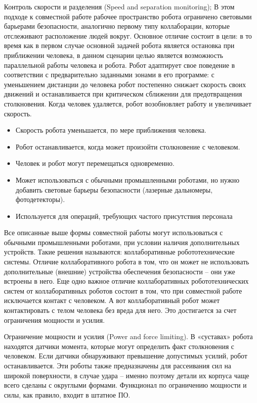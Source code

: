 Контроль скорости и разделения (Speed and separation monitoring);
В этом подходе к совместной работе рабочее пространство робота ограничено световыми барьерами безопасности, аналогично первому типу коллаборации, которые отслеживают расположение людей вокруг. Основное отличие состоит в цели: в то время как в первом случае основной задачей робота является остановка при приближении человека, в данном сценарии целью является возможность параллельной работы человека и робота. Робот адаптирует свое поведение в соответствии с предварительно заданными зонами в его программе: с уменьшением дистанции до человека робот постепенно снижает скорость своих движений и останавливается при критическом сближении для предотвращения столкновения. Когда человек удаляется, робот возобновляет работу и увеличивает скорость.
\begin{itemize}
	\item Скорость робота уменьшается, по мере приближения человека.
	\item Робот останавливается, когда может произойти столкновение с человеком.
	\item Человек и робот могут перемещаться одновременно.
	\item Может использоваться с обычными промышленными роботами, но нужно добавить световые барьеры безопасности (лазерные дальномеры, фотодетекторы).
	\item Используется для операций, требующих частого присутствия персонала
\end{itemize}

Все описанные выше формы совместной работы могут использоваться с обычными промышленными роботами, при условии наличия дополнительных устройств. Такие решения называются: коллаборативные робототехнические системы. Отличие коллаборативного робота в том, что он может не использовать дополнительные (внешние) устройства обеспечения безопасности – они уже встроены в него. Еще одно важное отличие коллаборативных робототехнических систем от коллаборативных роботов состоит в том, что при совместной работе исключается контакт с человеком. А вот коллаборативный робот может контактировать с телом человека без вреда для него. Это достигается за счет ограничения мощности и усилия.


Ограничение мощности и усилия (Power and force limiting). В «суставах» робота находятся датчики момента, которые могут определить факт столкновения с человеком. Если датчики обнаруживают превышение допустимых усилий, робот останавливается. Эти роботы также предназначены для рассеивания сил на широкой поверхности, в случае удара – именно поэтому детали их корпуса чаще всего сделаны с округлыми формами. Функционал по ограничению мощности и силы, как правило, входит в штатное ПО.

